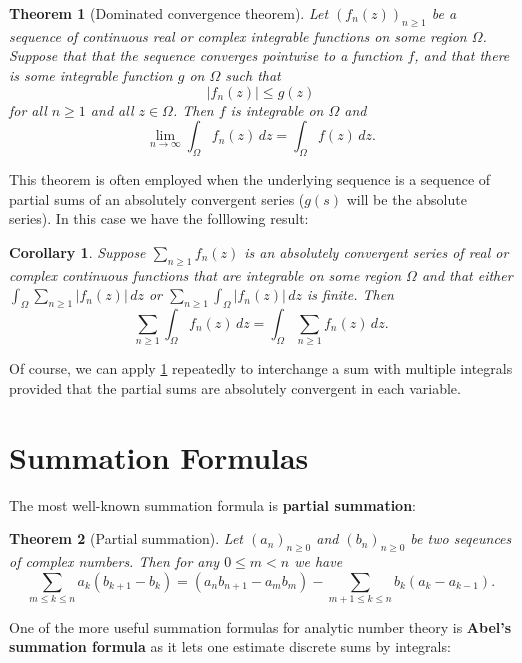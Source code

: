 \documentclass[12pt]{book}
\newtheorem{theorem}{Theorem}[section]
\newtheorem{corollary}{Corollary}[section]
\theoremstyle{definition}\newframedtheorem{method}{Method}
\newcommand{\W}{\Omega}
\newcommand{\<}{\langle}
\renewcommand{\>}{\rangle}
\begin{document}
    \begin{theorem}[Dominated convergence theorem]
      Let $(f_{n}(z))_{n \ge 1}$ be a sequence of continuous real or complex integrable functions on some region $\W$. Suppose that that the sequence converges pointwise to a function $f$, and that there is some integrable function $g$ on $\W$ such that
      \[
        |f_{n}(z)| \le g(z)
      \]
      for all $n \ge 1$ and all $z \in \W$. Then $f$ is integrable on $\W$ and
      \[
        \lim_{n \to \infty}\int_{\W}f_{n}(z)\,dz = \int_{\W}f(z)\,dz.
      \]
    \end{theorem}

    This theorem is often employed when the underlying sequence is a sequence of partial sums of an absolutely convergent series ($g(s)$ will be the absolute series). In this case we have the folllowing result:

    \begin{corollary}\label{cor:DCT_for_series_and_integrals}
      Suppose $\sum_{n \ge 1}f_{n}(z)$ is an absolutely convergent series of real or complex continuous functions that are integrable on some region $\W$ and that either $\int_{\W}\sum_{n \ge 1}|f_{n}(z)|\,dz$ or $\sum_{n \ge 1}\int_{\W}|f_{n}(z)|\,dz$ is finite. Then
      \[
        \sum_{n \ge 1}\int_{\W}f_{n}(z)\,dz = \int_{\W}\sum_{n \ge 1}f_{n}(z)\,dz.
      \]
    \end{corollary}

    Of course, we can apply \cref{cor:DCT_for_series_and_integrals} repeatedly to interchange a sum with multiple integrals provided that the partial sums are absolutely convergent in each variable.
  \section{Summation Formulas}\label{append:Summation_Formulas}
    The most well-known summation formula is \textbf{partial summation}:

    \begin{theorem}[Partial summation]\label{thm:partial_summation}
      Let $(a_{n})_{n \ge 0}$ and $(b_{n})_{n \ge 0}$ be two seqeunces of complex numbers. Then for any $0 \le m < n$ we have
      \[
        \sum_{m \le k \le n}a_{k}(b_{k+1}-b_{k}) = (a_{n}b_{n+1}-a_{m}b_{m})-\sum_{m+1 \le k \le n}b_{k}(a_{k}-a_{k-1}).
      \]
    \end{theorem}
    
    One of the more useful summation formulas for analytic number theory is \textbf{Abel's summation formula} as it lets one estimate discrete sums by integrals:
\end{document}
